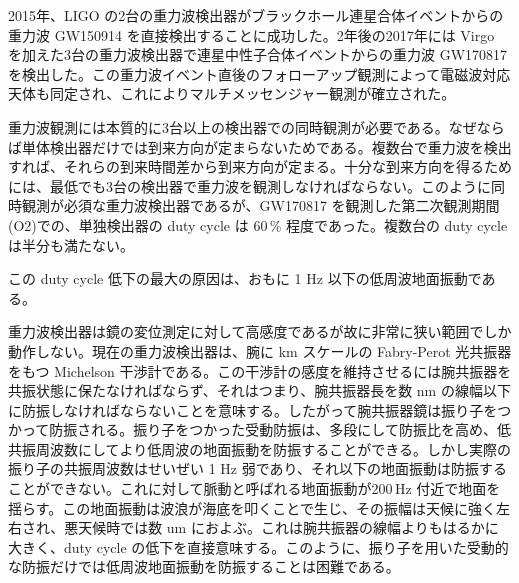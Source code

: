 
2015年、LIGO の2台の重力波検出器がブラックホール連星合体イベントからの重力波 GW150914 を直接検出することに成功した。2年後の2017年には Virgo を加えた3台の重力波検出器で連星中性子合体イベントからの重力波 GW170817 を検出した。この重力波イベント直後のフォローアップ観測によって電磁波対応天体も同定され、これによりマルチメッセンジャー観測が確立された。

重力波観測には本質的に3台以上の検出器での同時観測が必要である。なぜならば単体検出器だけでは到来方向が定まらないためである。複数台で重力波を検出すれば、それらの到来時間差から到来方向が定まる。十分な到来方向を得るためには、最低でも3台の検出器で重力波を観測しなければならない。このように同時観測が必須な重力波検出器であるが、GW170817 を観測した第二次観測期間(O2)での、単独検出器の duty cycle は $60\,\%$ 程度であった。複数台の duty cycle は半分も満たない。

この duty cycle 低下の最大の原因は、おもに 1 Hz 以下の低周波地面振動である。

重力波検出器は鏡の変位測定に対して高感度であるが故に非常に狭い範囲でしか動作しない。現在の重力波検出器は、腕に km スケールの Fabry-Perot 光共振器をもつ Michelson 干渉計である。この干渉計の感度を維持させるには腕共振器を共振状態に保たなければならず、それはつまり、腕共振器長を数 nm の線幅以下に防振しなければならないことを意味する。したがって腕共振器鏡は振り子をつかって防振される。振り子をつかった受動防振は、多段にして防振比を高め、低共振周波数にしてより低周波の地面振動を防振することができる。しかし実際の振り子の共振周波数はせいぜい 1 Hz 弱であり、それ以下の地面振動は防振することができない。これに対して脈動と呼ばれる地面振動が$200\,\mathrm{Hz}$ 付近で地面を揺らす。この地面振動は波浪が海底を叩くことで生じ、その振幅は天候に強く左右され、悪天候時では数 um におよぶ。これは腕共振器の線幅よりもはるかに大きく、duty cycle の低下を直接意味する。このように、振り子を用いた受動的な防振だけでは低周波地面振動を防振することは困難である。

